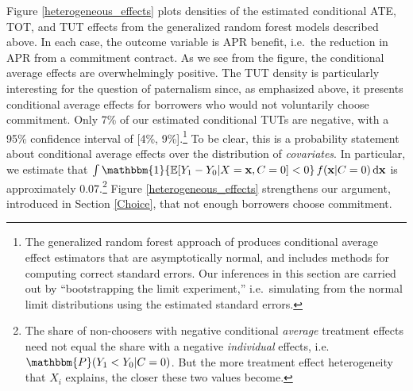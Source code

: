 \documentclass[12pt, a4paper]{article}
\begin{document}
Figure \ref{heterogeneous_effects} plots densities of the estimated conditional ATE, TOT, and TUT effects from the generalized random forest models described above.
In each case, the outcome variable is APR benefit, i.e.\ the reduction in APR from a commitment contract.
As we see from the figure, the conditional average effects are overwhelmingly positive. 
The TUT density is particularly interesting for the question of paternalism since, as emphasized above, it presents conditional average effects for borrowers who would not voluntarily choose commitment.
Only 7\% of our estimated conditional TUTs are negative, with a 95\% confidence interval of [4\%, 9\%].\footnote{The generalized random forest approach of \cite{atheygrf} produces conditional average effect estimators that are asymptotically normal, and includes methods for computing correct standard errors. %
Our inferences in this section are carried out by ``bootstrapping the limit experiment,'' i.e.\ simulating from the normal limit distributions using the estimated standard errors.} 
To be clear, this is a probability statement about conditional average effects over the distribution of \emph{covariates}.
In particular, we estimate that  $\int \mathbbm{1}\{\mathbb{E}[Y_1 - Y_0| X = \mathbf{x}, C = 0] < 0\} \, f(\mathbf{x}|C=0) \, \mathrm{d}\mathbf{x}$ is approximately 0.07.\footnote{The share of non-choosers with negative conditional \emph{average} treatment effects need not equal the share with a negative \emph{individual} effects, i.e.\ $\mathbbm{P}(Y_1 < Y_0| C = 0)$.
But the more treatment effect heterogeneity that $X_i$ explains, the closer these two values become.}
Figure \ref{heterogeneous_effects} strengthens our argument, introduced in Section \ref{Choice}, that not enough borrowers choose commitment. 
\end{document}
